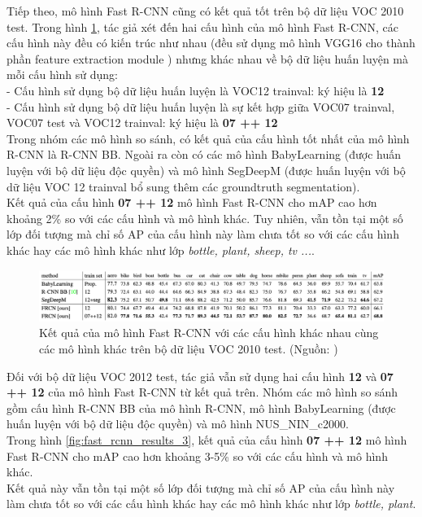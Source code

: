 {    \noindent
    Tiếp theo, mô hình Fast R-CNN cũng có kết quả tốt trên bộ dữ liệu VOC 2010 test.
    Trong hình \ref{fig:fast_rcnn_results_2}, tác giả xét đến hai cấu hình của mô hình Fast R-CNN, các cấu hình này đều có kiến trúc như nhau (đều sử dụng mô hình VGG16 cho thành phần feature extraction module ) nhưng khác nhau về bộ dữ liệu huấn luyện mà mỗi cấu hình sử dụng: \\
    - Cấu hình sử dụng bộ dữ liệu huấn luyện là VOC12 trainval: ký hiệu là \textbf{12} \\
    - Cấu hình sử dụng bộ dữ liệu huấn luyện là sự kết hợp giữa VOC07 trainval, VOC07 test và VOC12 trainval: ký hiệu là \textbf{07 ++ 12} \\
    Trong nhóm các mô hình so sánh, có kết quả của cấu hình tốt nhất của mô hình R-CNN là R-CNN BB.
    Ngoài ra còn có các mô hình BabyLearning (được huấn luyện với bộ dữ liệu độc quyền) và mô hình SegDeepM (được huấn luyện với bộ dữ liệu VOC 12 trainval bổ sung thêm các groundtruth  segmentation). \\
    Kết quả của cấu hình \textbf{07 ++ 12} mô hình Fast R-CNN cho mAP cao hơn khoảng 2\% so với các cấu hình và mô hình khác.
    Tuy nhiên, vẫn tồn tại một số lớp đối tượng  mà chỉ số AP của cấu hình này làm chưa tốt so với các cấu hình khác hay các mô hình khác như lớp \textit{bottle, plant, sheep, tv ...}.

    \begin{figure}[H]
        \centering
        \includegraphics[width=15cm] {images/fast_rcnn_results_2}
        \caption{Kết quả của mô hình Fast R-CNN với các cấu hình khác nhau cùng các mô hình khác trên bộ dữ liệu VOC 2010 test. (Nguồn: \cite{girshick2015fast})}
        \label{fig:fast_rcnn_results_2}
    \end{figure}

    \noindent
    Đối với bộ dữ liệu VOC 2012 test, tác giả vẫn sử dụng hai cấu hình \textbf{12} và \textbf{07 ++ 12} của mô hình Fast R-CNN từ kết quả trên. Nhóm các mô hình so sánh gồm cấu hình R-CNN BB của mô hình R-CNN, mô hình BabyLearning (được huấn luyện với bộ dữ liệu độc quyền) và mô hình NUS\_NIN\_c2000. \\
    Trong hình \ref{fig:fast_rcnn_results_3}, kết quả của cấu hình \textbf{07 ++ 12} mô hình Fast R-CNN cho mAP cao hơn khoảng 3-5\% so với các cấu hình và mô hình khác. \\
    Kết quả này vẫn tồn tại một số lớp đối tượng  mà chỉ số AP của cấu hình này làm chưa tốt so với các cấu hình khác hay các mô hình khác như lớp \textit{bottle, plant}.

}
